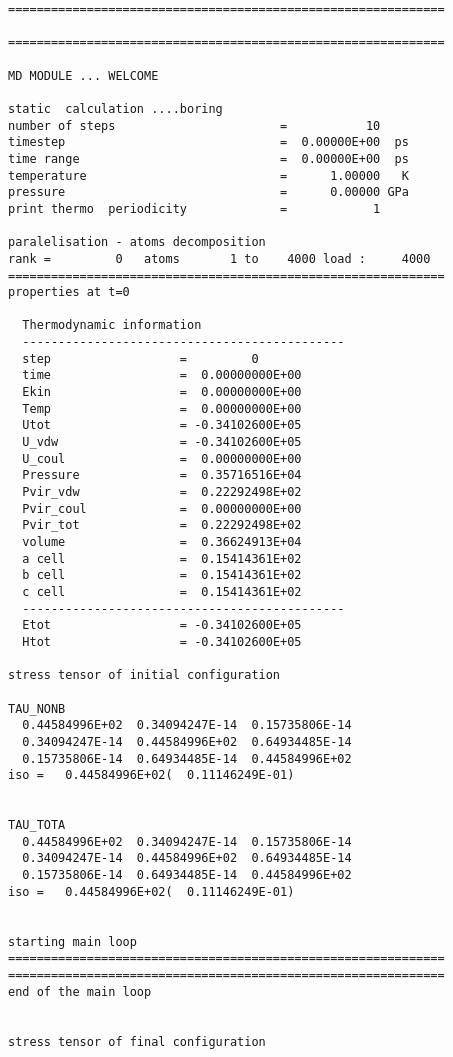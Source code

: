 \documentclass[a4paper]{article}
\begin{document}
\begin{verbatim}
=============================================================

=============================================================

MD MODULE ... WELCOME

static  calculation ....boring                 
number of steps                       =           10
timestep                              =  0.00000E+00  ps
time range                            =  0.00000E+00  ps
temperature                           =      1.00000   K
pressure                              =      0.00000 GPa
print thermo  periodicity             =            1

paralelisation - atoms decomposition
rank =         0   atoms       1 to    4000 load :     4000
=============================================================
properties at t=0

  Thermodynamic information 
  ---------------------------------------------
  step                  =         0
  time                  =  0.00000000E+00
  Ekin                  =  0.00000000E+00
  Temp                  =  0.00000000E+00
  Utot                  = -0.34102600E+05
  U_vdw                 = -0.34102600E+05
  U_coul                =  0.00000000E+00
  Pressure              =  0.35716516E+04
  Pvir_vdw              =  0.22292498E+02
  Pvir_coul             =  0.00000000E+00
  Pvir_tot              =  0.22292498E+02
  volume                =  0.36624913E+04
  a cell                =  0.15414361E+02
  b cell                =  0.15414361E+02
  c cell                =  0.15414361E+02
  ---------------------------------------------
  Etot                  = -0.34102600E+05
  Htot                  = -0.34102600E+05

stress tensor of initial configuration

TAU_NONB
  0.44584996E+02  0.34094247E-14  0.15735806E-14
  0.34094247E-14  0.44584996E+02  0.64934485E-14
  0.15735806E-14  0.64934485E-14  0.44584996E+02
iso =   0.44584996E+02(  0.11146249E-01)


TAU_TOTA
  0.44584996E+02  0.34094247E-14  0.15735806E-14
  0.34094247E-14  0.44584996E+02  0.64934485E-14
  0.15735806E-14  0.64934485E-14  0.44584996E+02
iso =   0.44584996E+02(  0.11146249E-01)


starting main loop
=============================================================
=============================================================
end of the main loop


stress tensor of final configuration


\end{verbatim}
\end{document}

